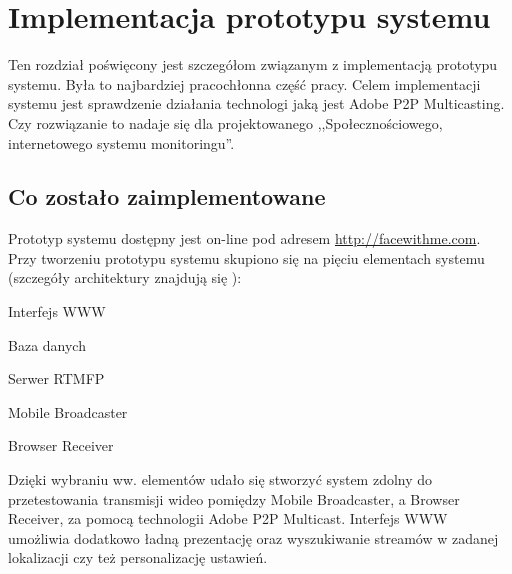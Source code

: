 \chapter{Implementacja prototypu systemu}
\label{cha:ImplementacjaPrototypu}

Ten rozdział poświęcony jest szczegółom związanym z implementacją prototypu systemu. Była to najbardziej pracochłonna część pracy. Celem implementacji systemu jest sprawdzenie działania technologi jaką jest Adobe P2P Multicasting. Czy rozwiązanie to nadaje się dla projektowanego ,,Społecznościowego, internetowego systemu monitoringu''.

\section{Co zostało zaimplementowane}
Prototyp systemu dostępny jest on-line pod adresem \url{http://facewithme.com}. Przy tworzeniu prototypu systemu skupiono się na pięciu elementach systemu (szczegóły architektury znajdują się ):

\begin{packed_item}
    \item{Interfejs WWW}
    \item{Baza danych}
    \item{Serwer RTMFP}
    \item{Mobile Broadcaster}
    \item{Browser Receiver}
\end{packed_item}

Dzięki wybraniu ww. elementów udało się stworzyć system zdolny do przetestowania transmisji wideo pomiędzy Mobile Broadcaster, a Browser Receiver, za pomocą technologii Adobe P2P Multicast. Interfejs WWW umożliwia dodatkowo ładną prezentację oraz wyszukiwanie streamów w zadanej lokalizacji czy też personalizację ustawień.

